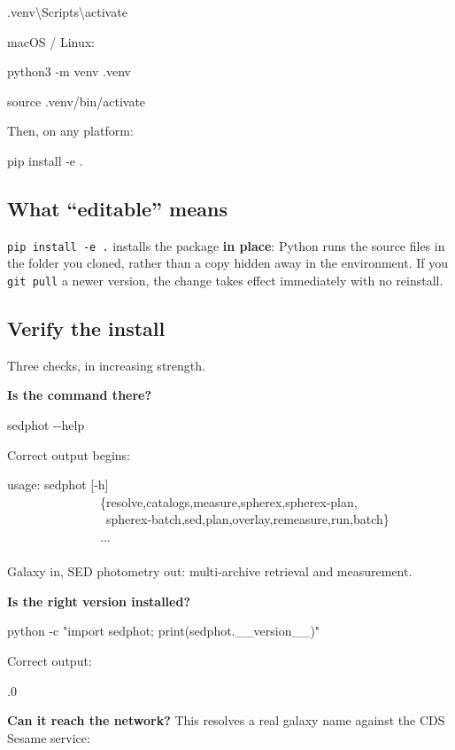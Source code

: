 \documentclass[11pt]{article}
\newcommand{\cmdline}[1]{\begin{cmd}\ttfamily #1\end{cmd}}
\begin{document}
\cmdline{.venv\textbackslash Scripts\textbackslash activate}

macOS / Linux:

\cmdline{python3 -m venv .venv}

\cmdline{source .venv/bin/activate}

Then, on any platform:

\cmdline{pip install -e .}

\subsection{What \enquote{editable} means}

\texttt{pip install -e .} installs the package \textbf{in place}: Python
runs the source files in the folder you cloned, rather than a copy hidden
away in the environment. If you \texttt{git pull} a newer version, the
change takes effect immediately with no reinstall.

\subsection{Verify the install}

Three checks, in increasing strength.

\textbf{Is the command there?}

\cmdline{sedphot -{}-help}

Correct output begins:

\begin{cmd}\ttfamily\frenchspacing
usage: sedphot [-h]\\
\mbox{}~~~~~~~~~~~~~~~\{resolve,catalogs,measure,spherex,spherex-plan,\\
\mbox{}~~~~~~~~~~~~~~~~spherex-batch,sed,plan,overlay,remeasure,run,batch\}\\
\mbox{}~~~~~~~~~~~~~~~...\\
\mbox{}\\
Galaxy in, SED photometry out: multi-archive retrieval and measurement.
\end{cmd}

\textbf{Is the right version installed?}

\cmdline{\frenchspacing python -c "import sedphot; print(sedphot.\_\_version\_\_)"}

Correct output:

\cmdline{0.3.0}

\textbf{Can it reach the network?} This resolves a real galaxy name
against the CDS Sesame service:
\end{document}

